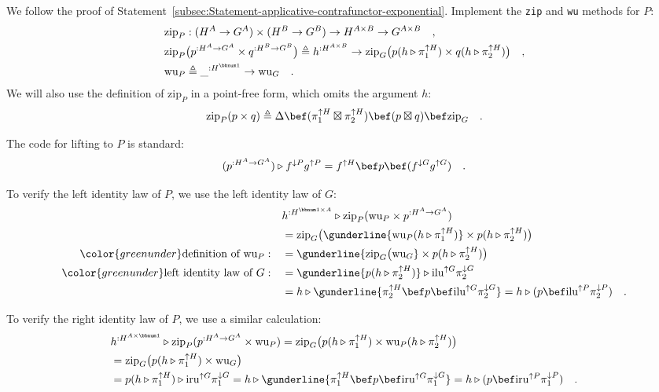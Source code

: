 We follow the proof of Statement~\ref{subsec:Statement-applicative-contrafunctor-exponential}.
Implement the \lstinline!zip! and \lstinline!wu! methods for $P$:
\begin{align*}
 & \text{zip}_{P}:(H^{A}\rightarrow G^{A})\times(H^{B}\rightarrow G^{B})\rightarrow H^{A\times B}\rightarrow G^{A\times B}\quad,\\
 & \text{zip}_{P}\big(p^{:H^{A}\rightarrow G^{A}}\times q^{:H^{B}\rightarrow G^{B}}\big)\triangleq h^{:H^{A\times B}}\rightarrow\text{zip}_{G}\big(p(h\triangleright\pi_{1}^{\uparrow H})\times q(h\triangleright\pi_{2}^{\uparrow H})\big)\quad,\\
 & \text{wu}_{P}\triangleq\_^{:H^{\bbnum 1}}\rightarrow\text{wu}_{G}\quad.
\end{align*}
We will also use the definition of $\text{zip}_{P}$ in a point-free
form, which omits the argument $h$:
\[
\text{zip}_{P}(p\times q)\triangleq\Delta\bef(\pi_{1}^{\uparrow H}\boxtimes\pi_{2}^{\uparrow H})\bef(p\boxtimes q)\bef\text{zip}_{G}\quad.
\]

The code for lifting to $P$ is standard:
\[
(p^{:H^{A}\rightarrow G^{A}})\triangleright f^{\downarrow P}g^{\uparrow P}=f^{\uparrow H}\bef p\bef(f^{\downarrow G}g^{\uparrow G})\quad.
\]

To verify the left identity law of $P$, we use the left identity
law of $G$:
\begin{align*}
 & h^{:H^{\bbnum 1\times A}}\triangleright\text{zip}_{P}(\text{wu}_{P}\times p^{:H^{A}\rightarrow G^{A}})\\
 & =\text{zip}_{G}\big(\gunderline{\text{wu}_{P}(h\triangleright\pi_{1}^{\uparrow H})}\times p(h\triangleright\pi_{2}^{\uparrow H})\big)\\
{\color{greenunder}\text{definition of }\text{wu}_{P}:}\quad & =\gunderline{\text{zip}_{G}\big(\text{wu}_{G}}\times p(h\triangleright\pi_{2}^{\uparrow H})\big)\\
{\color{greenunder}\text{left identity law of }G:}\quad & =\gunderline{p(h\triangleright\pi_{2}^{\uparrow H})}\triangleright\text{ilu}^{\uparrow G}\pi_{2}^{\downarrow G}\\
 & =h\triangleright\gunderline{\pi_{2}^{\uparrow H}\bef p\bef\text{ilu}^{\uparrow G}\pi_{2}^{\downarrow G}}=h\triangleright(p\bef\text{ilu}^{\uparrow P}\pi_{2}^{\downarrow P})\quad.
\end{align*}

To verify the right identity law of $P$, we use a similar calculation:
\begin{align*}
 & h^{:H^{A\times\bbnum 1}}\triangleright\text{zip}_{P}(p^{:H^{A}\rightarrow G^{A}}\times\text{wu}_{P})=\text{zip}_{G}\big(p(h\triangleright\pi_{1}^{\uparrow H})\times\text{wu}_{P}(h\triangleright\pi_{2}^{\uparrow H})\big)\\
 & =\text{zip}_{G}\big(p(h\triangleright\pi_{1}^{\uparrow H})\times\text{wu}_{G}\big)\\
 & =p(h\triangleright\pi_{1}^{\uparrow H})\triangleright\text{iru}^{\uparrow G}\pi_{1}^{\downarrow G}=h\triangleright\gunderline{\pi_{1}^{\uparrow H}\bef p\bef\text{iru}^{\uparrow G}\pi_{1}^{\downarrow G}}=h\triangleright(p\bef\text{iru}^{\uparrow P}\pi_{1}^{\downarrow P})\quad.
\end{align*}

